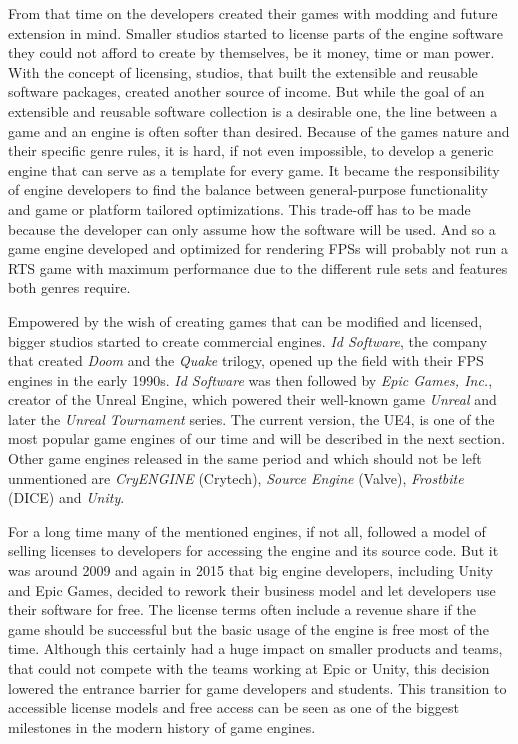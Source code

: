From that time on the developers created their games with modding and future extension in mind. Smaller studios started to license parts of the engine software they could not afford to create by themselves, be it money, time or man power. With the concept of licensing, studios, that built the extensible and reusable software packages, created another source of income. But while the goal of an extensible and reusable software collection is a desirable one, the line between a game and an engine is often softer than desired. Because of the games nature and their specific genre rules, it is hard, if not even impossible, to develop a generic engine that can serve as a template for every game. It became the responsibility of engine developers to find the balance between general-purpose functionality and game or platform tailored optimizations. This trade-off has to be made because the developer can only assume how the software will be used. And so a game engine developed and optimized for rendering \acp{FPS} will probably not run a \ac{RTS} game with maximum performance due to the different rule sets and features both genres require.

Empowered by the wish of creating games that can be modified and licensed, bigger studios started to create commercial engines. \textit{Id Software}, the company that created \textit{Doom} and the \textit{Quake} trilogy, opened up the field with their \ac{FPS} engines in the early 1990s. \textit{Id Software} was then followed by \textit{Epic Games, Inc.}, creator of the Unreal Engine, which powered their well-known game \textit{Unreal} and later the \textit{Unreal Tournament} series. The current version, the \ac{UE4}, is one of the most popular game engines of our time and will be described in the next section. Other game engines released in the same period and which should not be left unmentioned are \textit{CryENGINE} (Crytech), \textit{Source Engine} (Valve), \textit{Frostbite} (DICE) and \textit{Unity}.

For a long time many of the mentioned engines, if not all, followed a model of selling licenses to developers for accessing the engine and its source code. But it was around 2009 and again in 2015 that big engine developers, including Unity and Epic Games, decided to rework their business model and let developers use their software for free. The license terms often include a revenue share if the game should be successful but the basic usage of the engine is free most of the time. Although this certainly had a huge impact on smaller products and teams, that could not compete with the teams working at Epic or Unity, this decision lowered the entrance barrier for game developers and students. This transition to accessible license models and free access can be seen as one of the biggest milestones in the modern history of game engines. \cite[p.11-12]{GEA_2}

